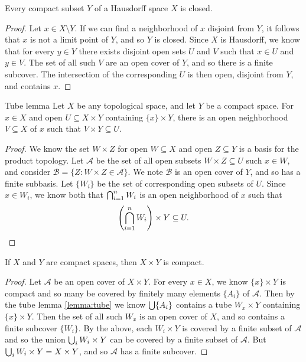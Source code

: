 \begin{prop}\label{prop:hausdorff-compact-closed}
    Every compact subset $Y$ of a Hausdorff space $X$ is closed.
\end{prop}

\begin{proof}
    Let $x \in X \setminus Y$. If we can find a neighborhood of $x$ disjoint from $Y$, it follows that $x$ is not a limit point of $Y$, and so $Y$ is closed. Since $X$ is Hausdorff, we know that for every $y \in Y$ there exists disjoint open sets $U$ and $V$ such that $x \in U$ and $y \in V$. The set of all such $V$ are an open cover of $Y$, and so there is a finite subcover. The intersection of the corresponding $U$ is then open, disjoint from $Y$, and contains $x$.
\end{proof}

\begin{lemma}Tube lemma\label{lemma:tube}\proofbreak
    Let $X$ be any topological space, and let $Y$ be a compact space. For $x \in X$ and open $U \subseteq X \times Y$ containing $\{x\} \times Y$, there is an open neighborhood $V \subseteq X$ of $x$ such that $V \times Y \subseteq U$.
\end{lemma}

\begin{proof}
    We know the set $W \times Z$ for open $W \subseteq X$ and open $Z \subseteq Y$ is a basis for the product topology. Let $\mathcal{A}$ be the set of all open subsets $W \times Z \subseteq U$ such $x \in W$, and consider $\mathcal{B} = \{ Z : W \times Z \in \mathcal{A} \}$. We note $\mathcal{B}$ is an open cover of $Y$, and so has a finite subbasis. Let $\{W_i\}$ be the set of corresponding open subsets of $U$. Since $x \in W_i$, we know both that $\bigcap_{i=1}^{n}W_i$ is an open neighborhood of $x$ such that
    \begin{align*}
        \left(\bigcap_{i=1}^{n}W_i\right) \times Y \subseteq U.
    \end{align*}
\end{proof}

\begin{thm}
    If $X$ and $Y$ are compact spaces, then $X \times Y$ is compact.
\end{thm}

\begin{proof}
    Let $\mathcal{A}$ be an open cover of $X \times Y$. For every $x \in X$, we know $\{x\} \times Y$ is compact and so many be covered by finitely many elements $\{A_i\}$ of $\mathcal{A}$. Then by the tube lemma \ref{lemma:tube} we know $\bigcup\{A_i\}$ contains a tube $W_x \times Y$ containing $\{x\} \times Y$. Then the set of all such $W_x$ is an open cover of $X$, and so contains a finite subcover $\{W_i\}$. By the above, each $W_i \times Y$ is covered by a finite subset of $\mathcal{A}$ and so the union $\bigcup_{i}W_i \times Y$ can be covered by a finite subset of $\mathcal{A}$. But $\bigcup_{i}W_i \times Y = X \times Y$, and so $\mathcal{A}$ has a finite subcover.
\end{proof}

